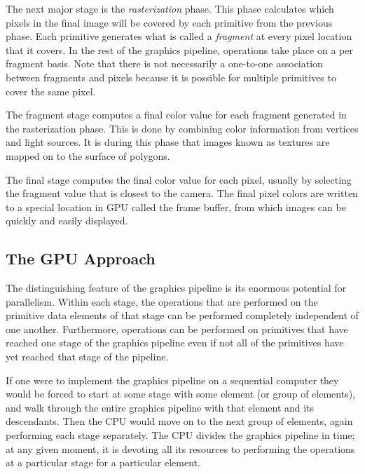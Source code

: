 \documentclass[12pt,twoside]{reedthesis}
\newcommand{\im}[1]{{\em#1}}
\begin{document}
The next major stage is the \im{rasterization} phase. This phase calculates which pixels in the final image will be covered by each primitive from the previous phase. Each primitive generates what is called a \im{fragment} at every pixel location that it covers. In the rest of the graphics pipeline, operations take place on a per fragment basis. Note that there is not necessarily a one-to-one association between fragments and pixels because it is possible for multiple primitives to cover the same pixel.

The fragment stage computes a final color value for each fragment generated in the rasterization phase. This is done by combining color information from vertices and light sources. It is during this phase that images known as textures are mapped on to the surface of polygons.

The final stage computes the final color value for each pixel, usually by selecting the fragment value that is closest to the camera. The final pixel colors are written to a special location in GPU called the frame buffer, from which images can be quickly and easily displayed.

\subsection{The GPU Approach}

The distinguishing feature of the graphics pipeline is its enormous potential for parallelism. Within each stage, the operations that are performed on the primitive data elements of that stage can be performed completely independent of one another. Furthermore, operations can be performed on primitives that have reached one stage of the graphics pipeline even if not all of the primitives have yet reached that stage of the pipeline.

If one were to implement the graphics pipeline on a sequential computer they would be forced to start at some stage with some element (or group of elements), and walk through the entire graphics pipeline with that element and its descendants. Then the CPU would move on to the next group of elements, again performing each stage separately. The CPU divides the graphics pipeline in time; at any given moment, it is devoting all its resources to performing the operations at a particular stage for a particular element.
\end{document}
